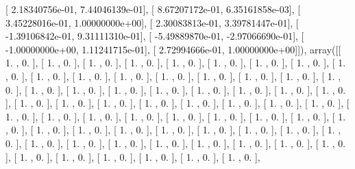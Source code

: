 \documentclass{article}
\begin{document}
       [  2.18340756e-01,   7.44046139e-01],
       [  8.67207172e-01,   6.35161858e-03],
       [  3.45228016e-01,   1.00000000e+00],
       [  2.30083813e-01,   3.39781447e-01],
       [ -1.39106842e-01,   9.31111310e-01],
       [ -5.49889870e-01,  -2.97066690e-01],
       [ -1.00000000e+00,   1.11241715e-01],
       [  2.72994666e-01,   1.00000000e+00]]), array([[ 1.        ,  0.        ],
       [ 1.        ,  0.        ],
       [ 1.        ,  0.        ],
       [ 1.        ,  0.        ],
       [ 1.        ,  0.        ],
       [ 1.        ,  0.        ],
       [ 1.        ,  0.        ],
       [ 1.        ,  0.        ],
       [ 1.        ,  0.        ],
       [ 1.        ,  0.        ],
       [ 1.        ,  0.        ],
       [ 1.        ,  0.        ],
       [ 1.        ,  0.        ],
       [ 1.        ,  0.        ],
       [ 1.        ,  0.        ],
       [ 1.        ,  0.        ],
       [ 1.        ,  0.        ],
       [ 1.        ,  0.        ],
       [ 1.        ,  0.        ],
       [ 1.        ,  0.        ],
       [ 1.        ,  0.        ],
       [ 1.        ,  0.        ],
       [ 1.        ,  0.        ],
       [ 1.        ,  0.        ],
       [ 1.        ,  0.        ],
       [ 1.        ,  0.        ],
       [ 1.        ,  0.        ],
       [ 1.        ,  0.        ],
       [ 1.        ,  0.        ],
       [ 1.        ,  0.        ],
       [ 1.        ,  0.        ],
       [ 1.        ,  0.        ],
       [ 1.        ,  0.        ],
       [ 1.        ,  0.        ],
       [ 1.        ,  0.        ],
       [ 1.        ,  0.        ],
       [ 1.        ,  0.        ],
       [ 1.        ,  0.        ],
       [ 1.        ,  0.        ],
       [ 1.        ,  0.        ],
       [ 1.        ,  0.        ],
       [ 1.        ,  0.        ],
       [ 1.        ,  0.        ],
       [ 1.        ,  0.        ],
       [ 1.        ,  0.        ],
       [ 1.        ,  0.        ],
       [ 1.        ,  0.        ],
       [ 1.        ,  0.        ],
       [ 1.        ,  0.        ],
       [ 1.        ,  0.        ],
       [ 1.        ,  0.        ],
       [ 1.        ,  0.        ],
       [ 1.        ,  0.        ],
       [ 1.        ,  0.        ],
       [ 1.        ,  0.        ],
       [ 1.        ,  0.        ],
       [ 1.        ,  0.        ],
       [ 1.        ,  0.        ],
       [ 1.        ,  0.        ],
       [ 1.        ,  0.        ],
       [ 1.        ,  0.        ],
       [ 1.        ,  0.        ],
       [ 1.        ,  0.        ],
       [ 1.        ,  0.        ],
\end{document}
